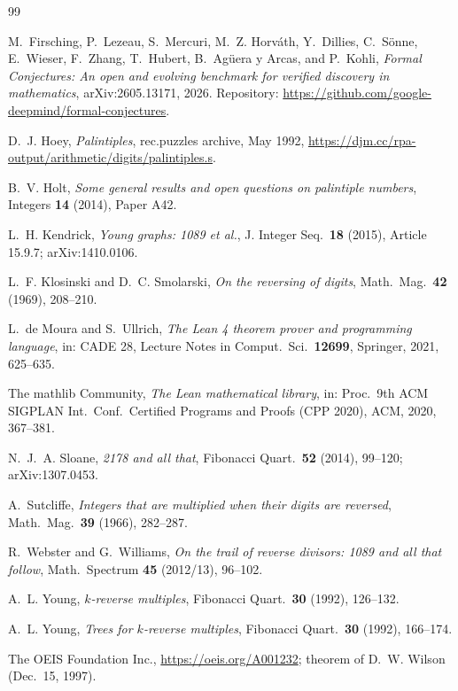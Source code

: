\documentclass[11pt]{amsart}
\theoremstyle{plain}
\theoremstyle{definition}
\begin{document}
{\small
\begin{thebibliography}{99}

M.~Firsching, P.~Lezeau, S.~Mercuri, M.~Z. Horv\'ath, Y.~Dillies, C.~S\"onne, E.~Wieser, F.~Zhang, T.~Hubert, B.~Ag\"uera y Arcas, and P.~Kohli, \emph{Formal Conjectures: An open and evolving benchmark for verified discovery in mathematics}, arXiv:2605.13171, 2026. Repository: \url{https://github.com/google-deepmind/formal-conjectures}.

D.~J. Hoey, \emph{Palintiples}, rec.puzzles archive, May 1992, \url{https://djm.cc/rpa-output/arithmetic/digits/palintiples.s}.

B.~V. Holt, \emph{Some general results and open questions on palintiple numbers}, Integers \textbf{14} (2014), Paper A42.

L.~H. Kendrick, \emph{Young graphs: 1089 et al.}, J. Integer Seq.\ \textbf{18} (2015), Article 15.9.7; arXiv:1410.0106.

L.~F. Klosinski and D.~C. Smolarski, \emph{On the reversing of digits}, Math.\ Mag.\ \textbf{42} (1969), 208--210.

L.~de Moura and S.~Ullrich, \emph{The Lean 4 theorem prover and programming language}, in: CADE 28, Lecture Notes in Comput.\ Sci.\ \textbf{12699}, Springer, 2021, 625--635.

The mathlib Community, \emph{The Lean mathematical library}, in: Proc.\ 9th ACM SIGPLAN Int.\ Conf.\ Certified Programs and Proofs (CPP 2020), ACM, 2020, 367--381.

N.~J.~A. Sloane, \emph{2178 and all that}, Fibonacci Quart.\ \textbf{52} (2014), 99--120; arXiv:1307.0453.

A.~Sutcliffe, \emph{Integers that are multiplied when their digits are reversed}, Math.\ Mag.\ \textbf{39} (1966), 282--287.

R.~Webster and G.~Williams, \emph{On the trail of reverse divisors: 1089 and all that follow}, Math.\ Spectrum \textbf{45} (2012/13), 96--102.

A.~L. Young, \emph{$k$-reverse multiples}, Fibonacci Quart.\ \textbf{30} (1992), 126--132.

A.~L. Young, \emph{Trees for $k$-reverse multiples}, Fibonacci Quart.\ \textbf{30} (1992), 166--174.

The OEIS Foundation Inc., \url{https://oeis.org/A001232}; theorem of D.~W. Wilson (Dec.~15, 1997).


\end{thebibliography}}
\end{document}
